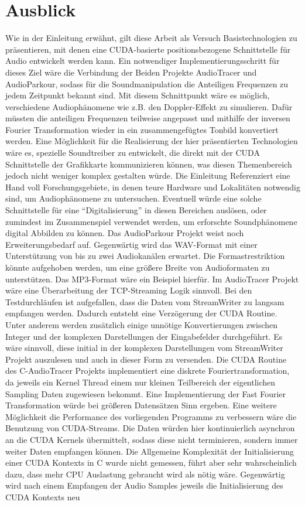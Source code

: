 
\section{Ausblick} \label{chap:farsight}

Wie in der Einleitung erwähnt, gilt diese Arbeit als Versuch Basistechnologien zu präsentieren, mit denen eine CUDA-basierte positionsbezogene Schnittstelle für Audio entwickelt werden kann. Ein notwendiger Implementierungsschritt für dieses Ziel wäre die Verbindung der Beiden Projekte AudioTracer und AudioParkour, sodass für die Soundmanipulation die Anteiligen Frequenzen zu jedem Zeitpunkt bekannt sind. Mit diesem Schnittpunkt wäre es möglich, verschiedene Audiophänomene wie z.B. den Doppler-Effekt zu simulieren. Dafür müssten die anteiligen Frequenzen teilweise angepasst und mithilfe der inversen Fourier Transformation wieder in ein zusammengefügtes Tonbild konvertiert werden. Eine Möglichkeit für die Realisierung der hier präsentierten Technologien wäre es, spezielle Soundtreiber zu entwickelt, die direkt mit der CUDA Schnittstelle der Grafikkarte kommunizieren können, was diesen Themenbereich jedoch nicht weniger komplex gestalten würde. Die Einleitung Referenziert eine Hand voll Forschungsgebiete, in denen teure Hardware und Lokalitäten notwendig sind, um Audiophänomene zu untersuchen. Eventuell würde eine solche Schnittstelle für eine \enquote{Digitalisierung} in diesen Bereichen auslösen, oder zumindest im Zusammenspiel verwendet werden, um erforschte Soundphänomene digital Abbilden zu können. Das AudioParkour Projekt weist noch Erweiterungsbedarf auf. Gegenwärtig wird das WAV-Format mit einer Unterstützung von bis zu zwei Audiokanälen erwartet. Die Formastrestriktion könnte aufgehoben werden, um eine größere Breite von Audioformaten zu unterstützen. Das MP3-Format wäre ein Beispiel hierfür. Im AudioTracer Projekt wäre eine Überarbeitung der TCP-Streaming Logik sinnvoll. Bei den Testdurchläufen ist aufgefallen, dass die Daten vom StreamWriter zu langsam empfangen werden. Dadurch entsteht eine Verzögerung der CUDA Routine. Unter anderem werden zusätzlich einige unnötige Konvertierungen zwischen Integer und der komplexen Darstellungen der Eingabefelder durchgeführt. Es wäre sinnvoll, diese initial in der komplexen Darstellungen vom StreamWriter Projekt auszulesen und auch in dieser Form zu versenden. Die CUDA Routine des C-AudioTracer Projekts implementiert eine diskrete Fouriertransformation, da jeweils ein Kernel Thread einem nur kleinen Teilbereich der eigentlichen Sampling Daten zugewiesen bekommt. Eine Implementierung der Fast Fourier Transformation würde bei größeren Datensätzen Sinn ergeben. Eine weitere Möglichkeit die Performance des vorliegenden Programms zu verbessern wäre die Benutzung von CUDA-Streams. Die Daten würden hier kontinuierlich asynchron an die CUDA Kernels übermittelt, sodass diese nicht terminieren, sondern immer weiter Daten empfangen können. Die Allgemeine Komplexität der Initialisierung einer CUDA Kontexts in C wurde nicht gemessen, führt aber sehr wahrscheinlich dazu, dass mehr CPU Auslastung gebraucht wird als nötig wäre. Gegenwärtig wird nach einem Empfangen der Audio Samples jeweils die Initialisierung des CUDA Kontexts neu 